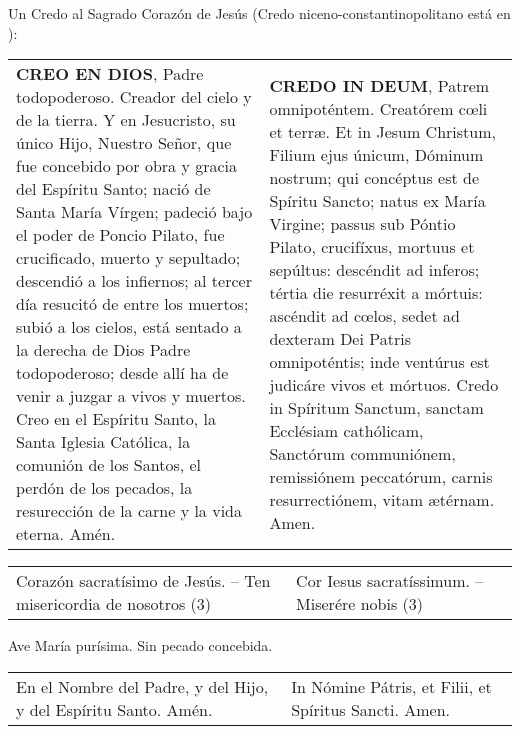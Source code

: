 \documentclass[./rosary.tex]{subfiles}
\begin{document}
Un Credo al Sagrado Corazón de Jesús (Credo niceno-constantinopolitano está en ):

\begin{longtable} { p{} p{} }
    \label{creed-apostles}
    \textbf{CREO EN DIOS}, Padre todopoderoso. Creador del cielo y de la tierra. Y en Jesucristo, su único Hijo, Nuestro Señor,
    que fue concebido por obra y gracia del Espíritu Santo; nació de Santa María Vírgen; padeció bajo el poder de Poncio Pilato,
    fue crucificado, muerto y sepultado; descendió a los infiernos; al tercer día resucitó de entre los muertos; subió a los cielos,
    está sentado a la derecha de Dios Padre todopoderoso; desde allí ha de venir a juzgar a vivos y muertos.
    Creo en el Espíritu Santo, la Santa Iglesia Católica, la comunión de los Santos, el perdón de los pecados,
    la resurección de la carne y la vida eterna. Amén.
        &
    \textbf{CREDO IN DEUM}, Patrem omnipoténtem. Creatórem cœli et terræ. Et in Jesum Christum, Filium ejus únicum, Dóminum nostrum;
    qui concéptus est de Spíritu Sancto; natus ex María Virgine; passus sub Póntio Pilato, crucifíxus, mortuus et sepúltus:
    descéndit ad inferos; tértia die resurréxit a mórtuis: ascéndit ad cœlos, sedet ad dexteram Dei Patris omnipoténtis;
    inde ventúrus est judicáre vivos et mórtuos. Credo in Spíritum Sanctum, sanctam Ecclésiam cathólicam, Sanctórum communiónem,
    remissiónem peccatórum, carnis resurrectiónem, vitam ætérnam. Amen.\\
\end{longtable}

\begin{longtable} { p{} p{} }
    Corazón sacratísimo de Jesús. -- Ten misericordia de nosotros (3)
        &
    Cor Iesus sacratíssimum. -- Miserére nobis (3)
\end{longtable}

\begin{center}
    Ave María purísima. Sin pecado concebida.
\end{center}

\begin{longtable} { p{} p{} }
    En el Nombre del Padre, y del Hijo, y del Espíritu Santo. Amén.
        &
    In Nómine Pátris, et Filii, et Spíritus Sancti. Amen.
\end{longtable}
\end{document}

